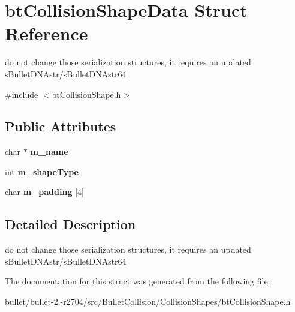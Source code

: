 \hypertarget{structbt_collision_shape_data}{\section{bt\+Collision\+Shape\+Data Struct Reference}
\label{structbt_collision_shape_data}
}


do not change those serialization structures, it requires an updated s\+Bullet\+D\+N\+Astr/s\+Bullet\+D\+N\+Astr64  




{\ttfamily \#include $<$bt\+Collision\+Shape.\+h$>$}

\subsection*{Public Attributes}
\begin{DoxyCompactItemize}
\item 
\hypertarget{structbt_collision_shape_data_a9298642fe38d09383e82f8c329124967}{char $\ast$ {\bfseries m\+\_\+name}}\label{structbt_collision_shape_data_a9298642fe38d09383e82f8c329124967}

\item 
\hypertarget{structbt_collision_shape_data_aa163414b23939ed6030fd19cf404b38a}{int {\bfseries m\+\_\+shape\+Type}}\label{structbt_collision_shape_data_aa163414b23939ed6030fd19cf404b38a}

\item 
\hypertarget{structbt_collision_shape_data_ae0262a228dae5cf646c32d31556bda5b}{char {\bfseries m\+\_\+padding} \mbox{[}4\mbox{]}}\label{structbt_collision_shape_data_ae0262a228dae5cf646c32d31556bda5b}

\end{DoxyCompactItemize}


\subsection{Detailed Description}
do not change those serialization structures, it requires an updated s\+Bullet\+D\+N\+Astr/s\+Bullet\+D\+N\+Astr64 

The documentation for this struct was generated from the following file\+:\begin{DoxyCompactItemize}
\item 
bullet/bullet-\/2.-\/r2704/src/\+Bullet\+Collision/\+Collision\+Shapes/bt\+Collision\+Shape.\+h\end{DoxyCompactItemize}
